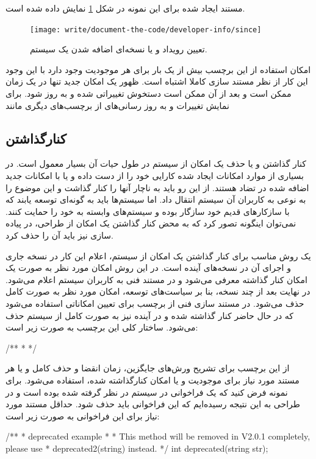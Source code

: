 مستند ایجاد شده برای این نمونه در شکل \ref{write/document-the-code/developer-info/since} نمایش 
داده شده است.
\begin{figure}
	\centering
	\texttt{[image: write/document-the-code/developer-info/since]}
	\caption[فهرست نویسندگان]{
		تعیین رویداد و یا نسخه‌ای اضافه شدن یک سیستم.
	}
	\label{write/document-the-code/developer-info/since}
\end{figure}

\begin{warning}
امکان استفاده از این برچسب بیش از یک بار برای هر موجودیت وجود دارد با این وجود این کار
از نظر مستند سازی کاملا اشتباه است.
ظهور یک امکان جدید تنها در یک زمان ممکن است و بعد از آن ممکن است دستخوش تغییراتی شده
و به روز شود.
برای نمایش تغییرات و به روز رسانی‌های از برچسب‌های دیگری مانند 
\end{warning}

\subsection{کنارگذاشتن}

کنار گذاشتن و یا حذف یک امکان از سیستم در طول حیات آن بسیار معمول است.
در بسیاری از موارد امکانات ایجاد شده کارایی خود را از دست داده و یا با امکانات
جدید اضافه شده در تضاد هستند.
از این رو باید به ناچار آنها را کنار گذاشت و این موضوع را به نوعی به کاربران آن
سیستم انتقال داد.
اما سیستم‌ها باید به گونه‌ای توسعه یابند که با سازکارهای قدیم خود سازگار بوده و
سیستم‌های وابسته به خود را حمایت کنند.
نمی‌توان اینگونه تصور کرد که به محض کنار گذاشتن یک امکان از طراحی، در پیاده سازی
نیز باید آن را حذف کرد.

یک روش مناسب برای کنار گذاشتن یک امکان از سیستم، اعلام این کار در نسخه جاری و
اجرای آن در نسخه‌های آینده است.
در این روش امکان مورد نظر به صورت یک امکان کنار گذاشته معرفی می‌شود و در مستند
فنی به کاربران سیستم اعلام می‌شود.
در نهایت بعد از چند نسخه، بنا بر سیاست‌های توسعه، امکان مورد نظر به صورت کامل
حذف می‌شود.
در مستند سازی فنی از برچسب  برای تعیین امکاناتی استفاده می‌شود که
در حال حاضر کنار گذاشته شده و در آینده نیز به صورت کامل از سیستم حذف می‌شود.
ساختار کلی این برچسب به صورت زیر است:
\begin{C++}
/**
 * 
 */
\end{C++} 

از این برچسب برای تشریح ورش‌های جایگزین، زمان انقضا و حذف کامل و یا هر مستند
مورد نیاز برای موجودیت و یا امکان کنارگذاشته شده، استفاده می‌شود.
برای نمونه فرض کنید که یک فراخوانی در سیستم در نظر گرفته شده بوده است و در
طراحی به این نتیجه رسیده‌ایم که این فراخوانی باید حذف شود.
حداقل مستند مورد نیاز برای این فراخوانی به صورت زیر است:
\begin{C++}
/**
 * \brief deprecated example
 *
 * \deprecated This method will be removed in V2.0.1 completely, please use
 * deprecated2(string) instead.
 */
int deprecated(string str);
\end{C++}

